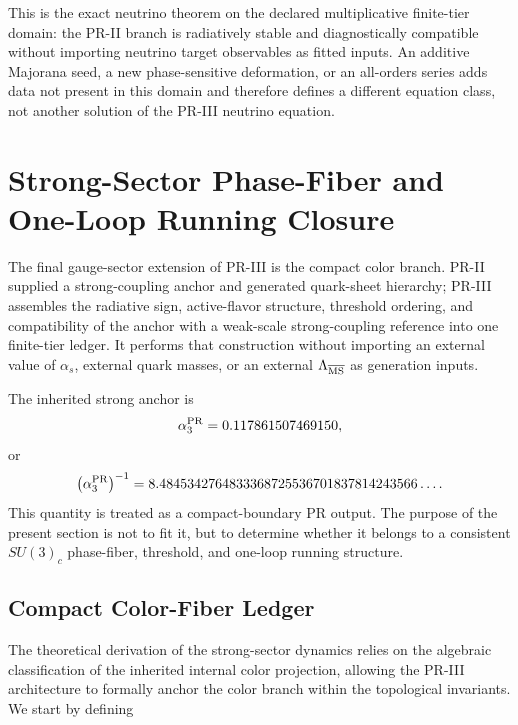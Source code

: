 \documentclass[11pt]{article}
\begin{document}
This is the exact neutrino theorem on the declared multiplicative finite-tier domain: the PR-II branch is radiatively stable and diagnostically compatible without importing neutrino target observables as fitted inputs. An additive Majorana seed, a new phase-sensitive deformation, or an all-orders series adds data not present in this domain and therefore defines a different equation class, not another solution of the PR-III neutrino equation.


\section{Strong-Sector Phase-Fiber and One-Loop Running Closure}
\label{sec:priii-strong-sector}

The final gauge-sector extension of PR-III is the compact color branch.  PR-II supplied a strong-coupling anchor and generated quark-sheet hierarchy; PR-III assembles the radiative sign, active-flavor structure, threshold ordering, and compatibility of the anchor with a weak-scale strong-coupling reference into one finite-tier ledger.  It performs that construction without importing an external value of \(\alpha_s\), external quark masses, or an external \(\Lambda_{\overline{\rm MS}}\) as generation inputs.

The inherited strong anchor is
\begin{equation}
\alpha_3^{\rm PR}
=
0.117861507469150,
\label{eq:priii-alpha3-anchor}
\end{equation}
or
\begin{equation}
\left(\alpha_3^{\rm PR}\right)^{-1}
=
8.4845342764833368725536701837814243566\ldots .
\end{equation}
This quantity is treated as a compact-boundary PR output.  The purpose of the present section is not to fit it, but to determine whether it belongs to a consistent \(SU(3)_c\) phase-fiber, threshold, and one-loop running structure.

\subsection{Compact Color-Fiber Ledger}
\label{subsec:priii-strong-color-fiber}
The theoretical derivation of the strong-sector dynamics relies on the algebraic classification of the inherited internal color projection, allowing the PR-III architecture to formally anchor the color branch within the topological invariants. We start by defining 
\end{document}
